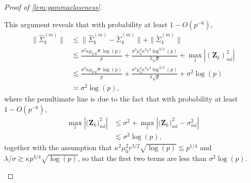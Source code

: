\documentclass[10pt]{article}
\newcommand{\0}{{\mathbf{0}}}
\newcommand{\1}{{\mathbf{1}}}
\renewcommand{\tilde}{\widetilde}
\renewcommand{\hat}{\widehat}
\renewcommand{\hat}{\widehat}
\begin{document}
\begin{proof}[Proof of \cref{lem:gammacloseness}]
\begin{itemize}
This argument reveals that with probability at least $1 - O(p^{-6})$,
\begin{align}
    \| \hat \Sigma^{(m)}_k \| &\leq \| \hat \Sigma^{(m)}_k - \tilde \Sigma^{(m)}_k \| + \| \tilde \Sigma^{(m)}_k \| \nonumber \\
    &\lesssim \frac{\sigma^2 \kappa \mu_0 \sqrt{r} \log(p)}{p} + \frac{\sigma^3 \mu_0^4 \kappa^3 r^3 \log^{3/2}(p)}{\lambda \sqrt{p}} + \max_{l} | (\mathbf{Z}_k)_{ml}^2 | \nonumber \\
    &\lesssim \frac{\sigma^2 \kappa \mu_0 \sqrt{r} \log(p)}{p} + \frac{\sigma^3 \mu_0^4 \kappa^3 r^3 \log^{3/2}(p)}{\lambda \sqrt{p}} + \sigma^2 \log(p) \nonumber \\
    &\asymp \sigma^2 \log(p), \label{sigmahatbound}
\end{align}
where the penultimate line is due to the fact that with probability at least $1- O(p^{-6})$, \begin{align*}
    \max_l | \big(\mathbf{Z}_k\big)_{ml}^2 | &\leq \sigma^2 + \max_l | \big(\mathbf{Z}_k\big)_{ml}^2 - \sigma^2_{ml} | \\
    &\lesssim \sigma^2 \log(p),
\end{align*}
together with the assumption that $\kappa^2 \mu_0^2 r^{3/2} \sqrt{\log(p)} \lesssim p^{1/4}$ and $\lambda/\sigma \gtrsim \kappa p^{3/4} \sqrt{\log(p)}$, so that the first two terms are less than $\sigma^2 \log(p)$.


\end{itemize}
\end{proof}
\end{document}
